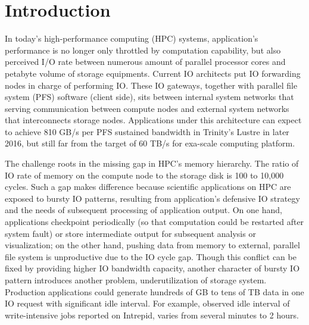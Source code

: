 \section{Introduction}

In today's high-performance computing (HPC) systems,
application's performance is no longer only throttled by computation capability,
but also perceived I/O rate between
numerous amount of parallel processor cores and 
petabyte volume of storage equipments.
Current IO architects put IO forwarding nodes in charge of performing IO.
These IO gateways, together with parallel file system (PFS) software (client side),
sits between internal system networks that serving communication
between compute nodes and external system networks
that interconnects storage nodes\cite{Ross:IOSystem}.
Applications under this architecture can expect to achieve
810 GB/s per PFS sustained bandwidth in Trinity's Lustre\cite{TrinitySystem}
in later 2016, but still far from the target of 60 TB/s
for exa-scale computing platform\cite{Shalf:HPCCS:2010}.

The challenge roots in the missing gap in HPC's memory hierarchy.
The ratio of IO rate of memory on the compute node to the storage disk
is 100 to 10,000 cycles\cite{TrinitySystem}.
Such a gap makes difference because scientific applications on HPC are exposed to
bursty IO patterns\cite{Carns:MSST:2011, Kim:PDSW:2010},
resulting from application's
defensive IO strategy\cite{Latham:CSD:2012, Naik:ICPPW:2009, Dennis:CUG:2009}
and the needs of subsequent processing of application output.
On one hand, applications checkpoint periodically
(so that computation could be restarted after system fault)
or store intermediate output for subsequent analysis or visualization;
on the other hand, pushing data from memory to external,
parallel file system is unproductive due to the IO cycle gap.
Though this conflict can be fixed by providing higher IO bandwidth capacity,
another character of bursty IO pattern introduces another problem,
underutilization of storage system.
Production applications could generate hundreds of GB to
tens of TB data in one IO request with significant idle interval.
For example, observed idle interval of write-intensive jobs
reported on Intrepid\cite{Liu:MSST:2012},
varies from several minutes to 2 hours.

